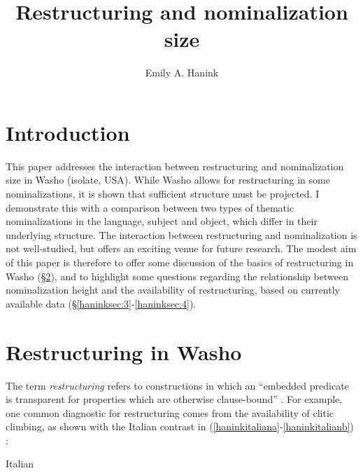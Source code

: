 \documentclass[output=paper]{langscibook}
\author{Emily A. Hanink\affiliation{The University of Manchester}}
\title{Restructuring and nominalization size}
\begin{document}
\maketitle

\section{Introduction}

 This paper addresses the interaction between restructuring and nominalization size in Washo (isolate, USA). While Washo allows for restructuring in some nominalizations, it is shown that sufficient structure must be projected. I demonstrate this with a comparison between two types of thematic nominalizations in the language, subject and object, which differ in their underlying structure. The interaction between restructuring and nominalization is not well-studied, but offers an exciting venue for future research. The modest aim of this paper is therefore to offer some discussion of the  basics of restructuring in Washo (\S\ref{haninksec:2}), and to highlight some questions regarding the relationship between nominalization height and the availability of restructuring, based on currently available data (\S\ref{haninksec:3}-\ref{haninksec:4}).

\section{Restructuring in Washo}\label{haninksec:2}


The term {\itshape restructuring} refers to constructions in which an ``embedded predicate is transparent
for properties which are otherwise clause-bound'' \citep[248]{wurmbrand2015}. For example, one common diagnostic for restructuring comes from the availability of clitic climbing, as shown with the Italian contrast in (\ref{haninkitaliana}-\ref{haninkitalianb}) \citep[991-992]{Wurmbrand2004}:

\ea Italian\\
 \z
\z
 
\end{document}
